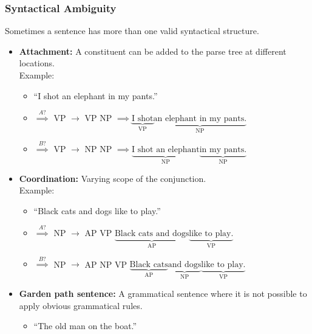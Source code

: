             \subsubsection{Syntactical Ambiguity} %
            	Sometimes a sentence has more than one valid syntactical structure.
                \begin{itemize}
                	\item \textbf{Attachment:} A constituent can be added to the parse tree at different locations. \\ Example:
                		\begin{itemize}
                			\item \enquote{I shot an elephant in my pants.}
                			\item[] \( \overset{A?}{\implies} \) VP \(\rightarrow\) VP NP \( \implies \underbrace{\text{I shot}}_{\text{VP}} \underbrace{\text{an elephant in my pants.}}_{\text{NP}} \)
                			\item[] \( \overset{B?}{\implies} \) VP \(\rightarrow\) NP NP \( \implies \underbrace{\text{I shot an elephant}}_{\text{NP}} \underbrace{\text{in my pants.}}_{\text{NP}} \)
                		\end{itemize}
                	\item \textbf{Coordination:} Varying scope of the conjunction. \\ Example:
                		\begin{itemize}
                			\item \enquote{Black cats and dogs like to play.}
                			\item[] \( \overset{A?}{\implies} \) NP \(\rightarrow\) AP VP \( \underbrace{\text{Black cats and dogs}}_{\text{AP}} \underbrace{\text{like to play.}}_{\text{VP}} \)
                			\item[] \( \overset{B?}{\implies} \) NP \(\rightarrow\) AP NP VP \( \underbrace{\text{Black cats}}_{\text{AP}} \underbrace{\text{and dogs}}_{\text{NP}} \underbrace{\text{like to play.}}_{\text{VP}} \)
                		\end{itemize}
                	\item \textbf{Garden path sentence:} A grammatical sentence where it is not possible to apply obvious grammatical rules.
                		\begin{itemize}
                			\item \enquote{The old man on the boat.}
                		\end{itemize}
                \end{itemize}
            
